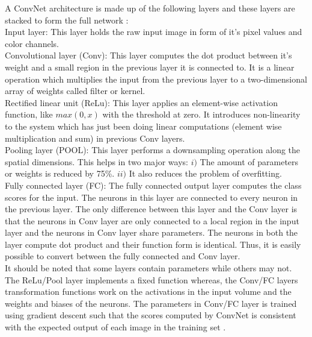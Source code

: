 A ConvNet architecture is made up of the following layers and these layers are stacked to form the full network \cite{krizhevsky2012imagenet}: \\
Input layer: This layer holds the raw input image in form of it's pixel values and color channels.\\
Convolutional layer (Conv): This layer computes the dot product between it's weight and a small region in the previous layer it is connected to. It is a linear operation which multiplies the input from the previous layer to a two-dimensional array of weights called filter or kernel. \\
Rectified linear unit (ReLu): This layer applies an element-wise activation function, like $max(0,x)$ with the threshold at zero. It introduces non-linearity to the system which has just been doing linear computations (element wise multiplication and sum) in previous Conv layers. \\
Pooling layer (POOL): This layer performs a downsampling operation along the spatial dimensions. This helps in two major ways: $i)$ The amount of parameters or weights is reduced by 75\%. $ii)$ It also reduces the problem of overfitting.\\
Fully connected layer (FC): The fully connected output layer computes the class scores for the input. The neurons in this layer are connected to every neuron in the previous layer. The only difference between this layer and the Conv layer is that the neurons in Conv layer are only connected to a local region in the input layer and the neurons in Conv layer share parameters. The neurons in both the layer compute dot product and their function form is identical. Thus, it is easily possible to convert between the fully connected and Conv layer.\\

It should be noted that some layers contain parameters while others may not. The ReLu/Pool layer implements a fixed function whereas, the Conv/FC layers transformation functions work on the activations in the input volume and the weights and biases of the neurons. The parameters in Conv/FC layer is trained using gradient descent such that the scores computed by ConvNet is consistent with the expected output of each image in the training set \cite{convNNStan}.

